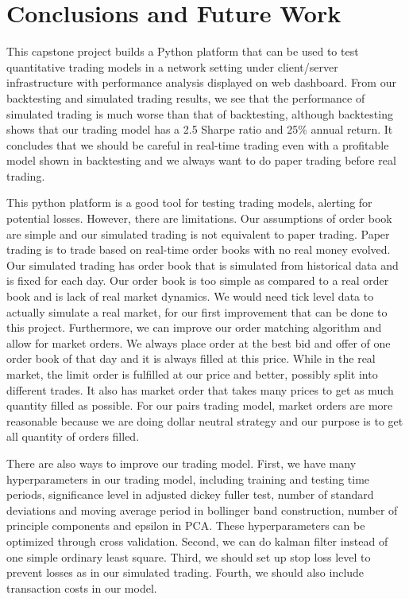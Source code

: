 \chapter{Conclusions and Future Work}
\label{chap:conclusions}

This capstone project builds a Python platform that can be used to test quantitative trading models in a network setting under client/server infrastructure with performance analysis displayed on web dashboard. From our backtesting and simulated trading results, we see that the performance of simulated trading is much worse than that of backtesting, although backtesting shows that our trading model has a 2.5 Sharpe ratio and 25\% annual return. It concludes that we should be careful in real-time trading even with a profitable model shown in backtesting and we always want to do paper trading before real trading. 

This python platform is a good tool for testing trading models, alerting for potential losses. However, there are limitations. Our assumptions of order book are simple and our simulated trading is not equivalent to paper trading. Paper trading is to trade based on real-time order books with no real money evolved. Our simulated trading has order book that is simulated from historical data and is fixed for each day. Our order book is too simple as compared to a real order book and is lack of real market dynamics. We would need tick level data to actually simulate a real market, for our first improvement that can be done to this project. Furthermore, we can improve our order matching algorithm and allow for market orders. We always place order at the best bid and offer of one order book of that day and it is always filled at this price. While in the real market, the limit order is fulfilled at our price and better, possibly split into different trades. It also has market order that takes many prices to get as much quantity filled as possible. For our pairs trading model, market orders are more reasonable because we are doing dollar neutral strategy and our purpose is to get all quantity of orders filled.

There are also ways to improve our trading model. First, we have many hyperparameters in our trading model, including training and testing time periods, significance level in adjusted dickey fuller test, number of standard deviations and moving average period in bollinger band construction, number of principle components and epsilon in PCA. These hyperparameters can be optimized through cross validation. Second, we can do kalman filter instead of one simple ordinary least square. Third, we should set up stop loss level to prevent losses as in our simulated trading. Fourth, we should also include transaction costs in our model.
